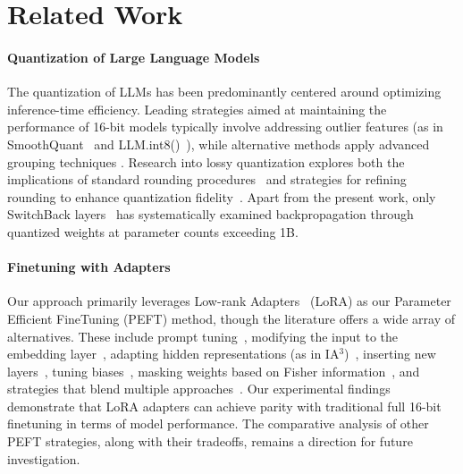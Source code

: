 \section{Related Work}

\paragraph{Quantization of Large Language Models} The quantization of LLMs has been predominantly centered around optimizing inference-time efficiency. Leading strategies aimed at maintaining the performance of 16-bit models typically involve addressing outlier features (as in SmoothQuant~\citep{xiao2022smoothquant} and LLM.int8()~\citep{dettmers2022llm}), while alternative methods apply advanced grouping techniques \citep{park2022nuqmm, yao2022zeroquant}. Research into lossy quantization explores both the implications of standard rounding procedures~\citep{dettmers2022case,zeng2022glm,pope2022efficiently} and strategies for refining rounding to enhance quantization fidelity~\citep{frantar2022gptq}. Apart from the present work, only SwitchBack layers~\citep{wortsman2023stable} has systematically examined backpropagation through quantized weights at parameter counts exceeding 1B.

\paragraph{Finetuning with Adapters} Our approach primarily leverages Low-rank Adapters~\citep{hu2021lora} (LoRA) as our Parameter Efficient FineTuning (PEFT) method, though the literature offers a wide array of alternatives. These include prompt tuning~\citep{qin2021learning,lester2021power,li2021prefix}, modifying the input to the embedding layer~\citep{an2022input}, adapting hidden representations (as in IA$^3$)~\citep{liu2022few}, inserting new layers~\citep{houlsby2019parameter}, tuning biases~\citep{zaken2021bitfit}, masking weights based on Fisher information~\citep{sung2021training}, and strategies that blend multiple approaches~\citep{henderson2021compacter}. Our experimental findings demonstrate that LoRA adapters can achieve parity with traditional full 16-bit finetuning in terms of model performance. The comparative analysis of other PEFT strategies, along with their tradeoffs, remains a direction for future investigation.


